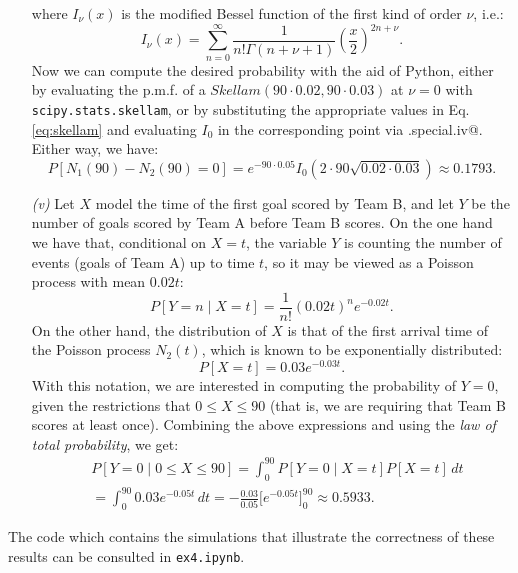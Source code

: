 \begin{enumerate}
        where $I_\nu(x)$ is the modified Bessel function of the first kind of order \( \nu \), i.e.:
\[
  I_{\nu}(x) = \sum_{n=0}^{\infty} \frac{1}{n! \Gamma(n + \nu + 1)}\left( \frac{x}{2} \right)^{2n + \nu}.
\]
Now we can compute the desired probability with the aid of Python, either by evaluating the p.m.f. of a $Skellam(90\cdot 0.02, 90\cdot 0.03)$ at $\nu=0$ with \verb|scipy.stats.skellam|, or by substituting the appropriate values in Eq. \eqref{eq:skellam} and evaluating $I_0$ in the corresponding point via \verb@scipy.special.iv@. Either way, we have:
\[
P[N_1(90)- N_2(90) = 0]=e^{-90\cdot 0.05}I_0(2\cdot 90\sqrt{0.02\cdot 0.03}) \approx 0.1793.
\]
  \item[\textit{(v)}] Let $X$ model the time of the first goal scored by Team B, and let $Y$ be the number of goals scored by Team A before Team B scores. On the one hand we have that, conditional on $X=t$, the variable $Y$ is counting the number of events (goals of Team A) up to time $t$, so it may be viewed as a Poisson process with mean $0.02t$:
  \[
  P[Y=n\mid X=t]=\frac{1}{n!}(0.02t)^n e^{-0.02t}.
  \]
  On the other hand, the distribution of $X$ is that of the first arrival time of the Poisson process $N_2(t)$, which is known to be exponentially distributed:
  \[
  P[X=t]= 0.03e^{-0.03t}.
  \]
  With this notation, we are interested in computing the probability of $Y=0$, given the restrictions that $0\leq X\leq 90$ (that is, we are requiring that Team B scores at least once). Combining the above expressions and using the \textit{law of total probability}, we get:
  \[
  \begin{aligned}
  &P[Y=0\mid0\leq X \leq 90]=\int_0^{90} P[Y=0\mid X=t]P[X=t]\, dt\\
  &=  \int_0^{90}0.03 e^{-0.05t}\, dt= -\frac{0.03}{0.05}\Big[ e^{-0.05t}\Big]_0^{90} \approx 0.5933.
\end{aligned}
  \]
\end{enumerate}

The code which contains the simulations that illustrate the correctness of these results can be consulted in \verb|ex4.ipynb|.
